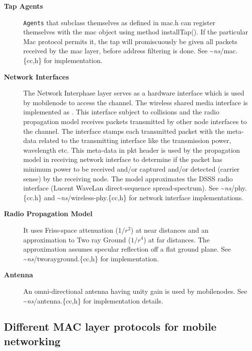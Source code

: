 \begin{description}
\item[{\bf Tap Agents}] {\tt Agents} that subclass themselves as
   defined in mac.h can register themselves
  with the mac object using method installTap(). If the particular Mac
  protocol permits it, the tap will promiscuously be 
  given all packets received by the mac layer, before address filtering
  is done. See \textasciitilde\emph{ns}/{mac.\{cc,h\}} for  implementation. 

\item[{\bf Network Interfaces}] The Network Interphase layer serves as
  a hardware interface which is used by mobilenode to access the
  channel. The wireless shared media interface is implemented as
  . This interface
  subject to collisions and the radio propagation model receives
  packets transmitted by other node interfaces to the channel. The
  interface stamps each transmitted packet with the meta-data related
  to the transmitting interface like the transmission power,
  wavelength etc. This meta-data in pkt header is used by the
  propagation model in receiving network interface to determine if the
  packet has minimum power to be received and/or captured and/or
  detected (carrier sense) by the receiving node. The model
  approximates the DSSS radio interface (Lucent WaveLan
  direct-sequence spread-spectrum). See \textasciitilde\emph{ns}/{phy.\{cc.h\}} and
  \textasciitilde\emph{ns}/{wireless-phy.\{cc,h\}} for network interface implementations.

\item[{\bf Radio Propagation Model}]  It uses Friss-space attenuation
  ($1/r^2$) at near distances and an approximation to Two ray Ground
  ($1/r^4$) at far distances. The approximation assumes specular
  reflection off a flat ground plane. See \textasciitilde\emph{ns}/{tworayground.\{cc,h\}}
  for implementation.

\item[{\bf Antenna}] An omni-directional antenna having unity gain is 
  used by mobilenodes. See \textasciitilde\emph{ns}/{antenna.\{cc,h\}} for implementation
  details. 
\end{description}

\subsection{Different MAC layer protocols for mobile networking}
\label{sec:mobilenode-mac}

